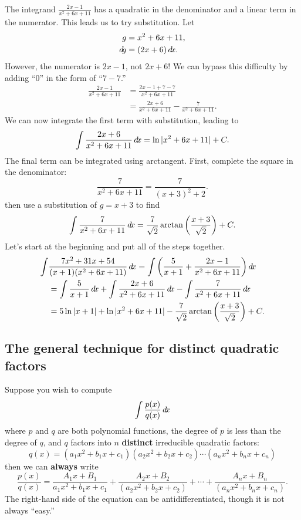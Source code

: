 \documentclass{ximera}
\begin{document}
\begin{example}
\begin{explanation}
    The integrand $\frac{2x-1}{x^2+6x+11}$ has a quadratic in the
    denominator and a linear term in the numerator. This leads us to
    try substitution. Let
    \begin{align*}
      g &= x^2+6x+11,\\
      \mathop{}\!d\! g  &= (2x+6)\mathop{}\!d\! x.
    \end{align*}
    However, the numerator is $2x-1$, not $2x+6$! We can bypass this
    difficulty by adding ``$0$'' in the form of ``$7-7$.''
\begin{align*}
  \frac{2x-1}{x^2+6x+11} &= \frac{2x-1+7-7}{x^2+6x+11} \\
  &= \frac{2x+6}{x^2+6x+11} - \frac{7}{x^2+6x+11}.
\end{align*}
We can now integrate the first term with substitution, leading to
\[
\int \frac{2x+6}{x^2+6x+11} \mathop{}\!d\! x = \ln|x^2+6x+11| + C.
\]
The final term can be integrated using arctangent. First, complete the
square in the denominator:
\[
\frac{7}{x^2+6x+11} = \frac{7}{(x+3)^2+2}.
\]
then use a substitution of $g = x+3$ to find
\[
\int \frac{7}{x^2+6x+11}\mathop{}\!d\! x = \frac{7}{\sqrt{2}}\arctan\left(\frac{x+3}{\sqrt{2}}\right)+C.
\]
Let's start at the beginning and put all of the steps together.
\begin{align*}
\int&\frac{7x^2+31x+54}{(x+1)(x^2+6x+11)}\d x = \int\left(\frac{5}{x+1} + \frac{2x-1}{x^2+6x+11}\right)\d x \\
			&= \int\frac{5}{x+1}\d x  + \int\frac{2x+6}{x^2+6x+11}\d x -\int\frac{7}{x^2+6x+11}\d x \\
			&= 5\ln|x+1|+ \ln|x^2+6x+11| -\frac{7}{\sqrt{2}}\arctan\left(\frac{x+3}{\sqrt{2}}\right)+C.
\end{align*}
  \end{explanation}
\end{example}


\subsection{The general technique for distinct quadratic factors}

Suppose you wish to compute
\[
\int \frac{p(x)}{q(x)} \mathop{}\!d\! x
\]
where $p$ and $q$ are both polynomial functions, the degree of $p$ is
less than the degree of $q$, and $q$ factors into $n$
\textbf{distinct} irreducible quadratic factors:
\[
q(x) = (a_1x^2 + b_1 x + c_1) (a_2x^2 + b_2 x + c_2)\cdots  (a_nx^2 + b_n x + c_n) 
\]
then we can \textbf{always} write
\[
\frac{p(x)}{q(x)}  = \frac{A_1x+B_1}{a_1x^2 + b_1 x + c_1} + \frac{A_2x+B_2}{(a_2x^2 + b_2 x + c_2)} + \cdots + \frac{A_nx+B_n}{(a_nx^2 + b_n x + c_n)}. 
\]
The right-hand side of the equation can be antidifferentiated, though it is not always ``easy.''
\end{document}
